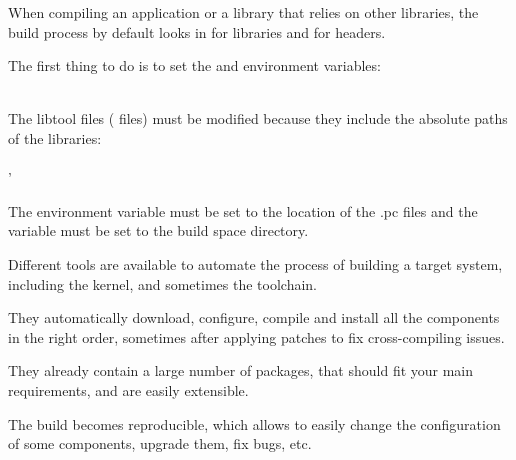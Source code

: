   \startitemize
  \item When compiling an application or a library that relies on
    other libraries, the build process by default looks in
     for libraries and  for headers.
  \item The first thing to do is to set the  and
     environment
    variables:\\
    \\
  \item The libtool files ( files) must be modified because they
    include the absolute paths of the libraries:\\
    \\
    '
  \item The  environment variable must be set to
    the location of the .pc files and the
     variable must be set to the build
    space directory.
\stopitemize

  \startitemize
  \item Different tools are available to automate the process of
    building a target system, including the kernel, and sometimes the
    toolchain.
  \item They automatically download, configure, compile and install
    all the components in the right order, sometimes after applying
    patches to fix cross-compiling issues.
  \item They already contain a large number of packages, that should
    fit your main requirements, and are easily extensible.
  \item The build becomes reproducible, which allows to easily change
    the configuration of some components, upgrade them, fix bugs, etc.
  \stopitemize


